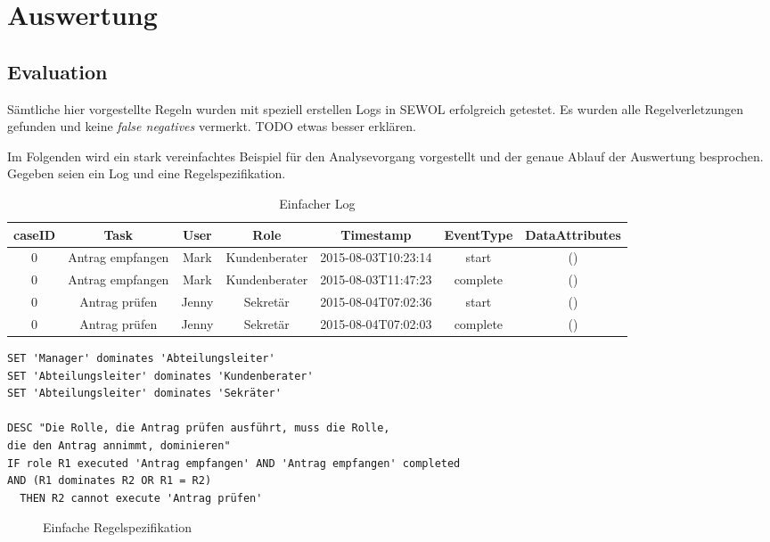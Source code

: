 
\chapter{Auswertung} %

\label{Chapter5} %

\section{Evaluation}
Sämtliche hier vorgestellte Regeln wurden mit speziell erstellen Logs in SEWOL erfolgreich getestet. Es wurden alle Regelverletzungen gefunden und keine \textit{false negatives} vermerkt. TODO etwas besser erklären.

Im Folgenden wird ein stark vereinfachtes Beispiel für den Analysevorgang vorgestellt und der genaue Ablauf der Auswertung besprochen. Gegeben seien ein Log und eine Regelspezifikation.

\begin{table}[h!]
\footnotesize
\begin{tabular}{|c|c|c|c|c|c|c|}
\hline
caseID&Task&User&Role&Timestamp&EventType&DataAttributes\\
\hline
0&Antrag empfangen&Mark&Kundenberater&2015-08-03T10:23:14&start&()\\
0&Antrag empfangen&Mark&Kundenberater&2015-08-03T11:47:23&complete&()\\
0&Antrag prüfen&Jenny&Sekretär&2015-08-04T07:02:36&start&()\\
0&Antrag prüfen&Jenny&Sekretär&2015-08-04T07:02:03&complete&()\\
\hline
\end{tabular}
\caption{Einfacher Log}
\end{table}

\begin{verbatim}
SET 'Manager' dominates 'Abteilungsleiter'
SET 'Abteilungsleiter' dominates 'Kundenberater'
SET 'Abteilungsleiter' dominates 'Sekräter'

DESC "Die Rolle, die Antrag prüfen ausführt, muss die Rolle,
die den Antrag annimmt, dominieren"
IF role R1 executed 'Antrag empfangen' AND 'Antrag empfangen' completed
AND (R1 dominates R2 OR R1 = R2)
  THEN R2 cannot execute 'Antrag prüfen'
\end{verbatim}
\begin{figure}[h]
\caption{Einfache Regelspezifikation}
\end{figure}

